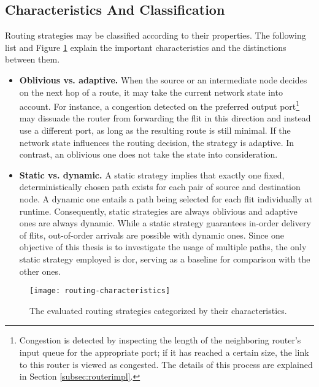 \subsection{Characteristics And Classification}\label{subsec:routingclassification}
Routing strategies may be classified according to their properties. The following list and Figure \ref{fig:routingcharacteristics} explain the important
characteristics and the distinctions between them.
\begin{itemize}
    \item \textbf{Oblivious vs. adaptive.} When the source or an intermediate node decides on the next hop of a route, it may take the current
        network state into account. For instance, a congestion detected on the preferred output port\footnote{Congestion is detected by inspecting the
        length of the neighboring router's input queue for the appropriate port; if it has reached a certain size, the link to this router is viewed as congested. The details
        of this process are explained in Section \ref{subsec:routerimpl}.} may dissuade the router from forwarding the flit in this direction and instead
        use a different port, as long as the resulting route is still minimal. If the network state influences the routing decision, the strategy is
        adaptive. In contrast, an oblivious one does not take the state into consideration.
    \item \textbf{Static vs. dynamic.} A static strategy implies that exactly one fixed, deterministically chosen path exists for each pair of source
        and destination node. A dynamic one entails a path being selected for each flit individually at runtime. Consequently, static strategies are
        always oblivious and adaptive ones are always dynamic. While a static strategy guarantees in-order delivery of flits, out-of-order arrivals are
        possible with dynamic ones. Since one objective of this thesis is to investigate the usage of multiple paths, the
        only static strategy employed is \gls{dor}, serving as a baseline for comparison with the other ones.
\end{itemize}
\vspace{0.5\baselineskip}

\begin{figure}
    \centering
    \texttt{[image: routing-characteristics]}
    \caption[Routing strategies by category]{The evaluated routing strategies categorized by their characteristics.}
    \label{fig:routingcharacteristics}
\end{figure}

